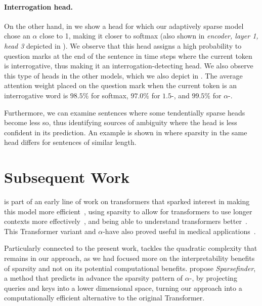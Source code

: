 \paragraph*{Interrogation head.}
On the other hand, in  we show a head for which our
adaptively sparse model chose an $\alpha$ close to 1, making it
closer to softmax (also shown in {\it encoder, layer 1, head 3}
depicted in ). We observe that this head
assigns a high probability to question marks at the end of the
sentence in time steps where the current token is interrogative, thus
making it an interrogation-detecting head. We also observe this type
of heads in the other models, which we also depict in
. The average attention weight placed on the
question mark when the current token is an interrogative word is
$98.5\%$ for softmax, $97.0\%$ for $1.5$-\entmaxtext, and $99.5\%$
for $\alpha$-\entmaxtext.

Furthermore, we can examine sentences where some tendentially sparse
heads become less so, thus identifying sources of ambiguity where the
head is less confident in its prediction. An example is shown in
 where sparsity in the same head differs
for sentences of similar length.

\section{Subsequent Work}\label{sec:subsequent_work_adapt}

\citet{correia2019adaptively} is part of an early line of work
on transformers that sparked interest in making this model more
efficient~\citep[\textit{inter
        alia}]{daras2020SMYRFEfficientAttention,
    li2020SACAcceleratingStructuring, merrill2021EffectsParameterNorm,
    roy2021EfficientContentBasedSparse}, using sparsity to allow for
transformers to use longer contexts more
effectively~\citep[\textit{inter alia}]{jiang2020LongDocumentRanking,
    qiu2020BlockwiseSelfAttentionLong, sukhbaatar2021NotAllMemories}, and
being able to understand transformers better~\citep[\textit{inter
        alia}]{you2020HardCodedGaussianAttention,
    rogers2020PrimerBERTologyWhat, pande2021headshypothesisunifying}.
This Transformer variant and $\alpha$-\entmaxtext have also proved
useful in medical applications~\citep{guo2020LearningLatentForests,
    yun2021SpecTrSpectralTransformer}.

Particularly connected to the present work,
\citet{treviso2021PredictingAttentionSparsity} tackles the quadratic
complexity that remains in our approach, as we had focused more on
the interpretability benefits of sparsity and not on its potential
computational benefits.
\citet{treviso2021PredictingAttentionSparsity} propose
\emph{Sparsefinder}, a method that predicts in advance the sparsity
pattern of $\alpha$-\entmaxtext, by projecting queries and keys into
a lower dimensional space, turning our approach into a
computationally efficient alternative to the original Transformer.

